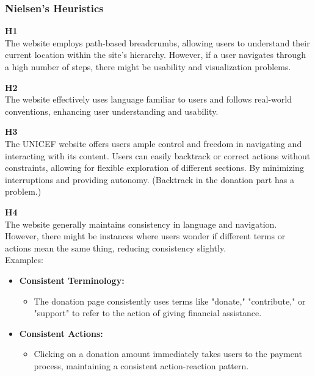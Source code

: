 \subsubsection{Nielsen's Heuristics}
\begin{description}
    \item {\textbf{H1} \color{unicefGray}{Visibility of system status}}\\
    The website employs path-based breadcrumbs, allowing users to understand their current location within the site's hierarchy. However, if a user navigates through a high number of steps, there might be usability and visualization problems.
    \item {\textbf{H2} \color{unicefGray}{Match between system and the real world}}\\
    The website effectively uses language familiar to users and follows real-world conventions, enhancing user understanding and usability.
    \item {\textbf{H3} \color{unicefGray}{User control and freedom}}\\
    The UNICEF website offers users ample control and freedom in navigating and interacting with its content. Users can easily backtrack or correct actions without constraints, allowing for flexible exploration of different sections. By minimizing interruptions and providing autonomy. (Backtrack in the donation part has a problem.)
    \item {\textbf{H4} \color{unicefGray}{Consistency and standards}}\\
    The website generally maintains consistency in language and navigation. However, there might be instances where users wonder if different terms or actions mean the same thing, reducing consistency slightly.\\
    Examples:
    \begin{itemize}
        \item \textbf{Consistent Terminology:}
        \begin{itemize}
            \item The donation page consistently uses terms like "donate," "contribute," or "support" to refer to the action of giving financial assistance.
        \end{itemize}
        \item \textbf{Consistent Actions:}
        \begin{itemize}
            \item Clicking on a donation amount immediately takes users to the payment process, maintaining a consistent action-reaction pattern.

\end{itemize}
\end{itemize}
\end{description}
